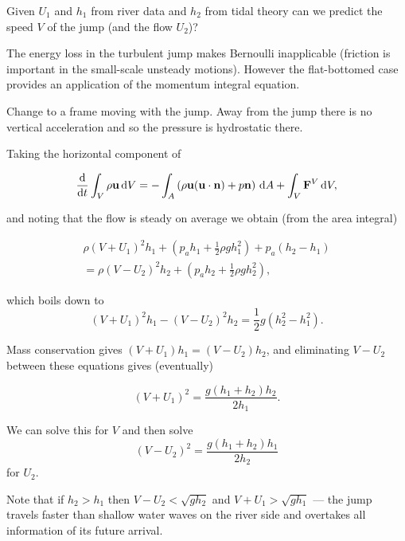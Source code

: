 \documentclass{notes}
\begin{document}
\vspace{2in}

Given $U_1$ and $h_1$ from river data and $h_2$ from tidal theory can
we predict the speed $V$ of the jump (and the flow $U_2$)?

The energy loss in the turbulent jump makes Bernoulli inapplicable
(friction is important in the small-scale unsteady motions).  However
the flat-bottomed case provides an application of the momentum
integral equation.

Change to a frame moving with the jump.  Away from the jump there is
no vertical acceleration and so the pressure is hydrostatic there.

\vspace*{2in}

Taking the horizontal component of

\[
\frac{\mathrm{d}}{\mathrm{d} t} \int_V \rho \mathbf{u} \,\mathrm{d} V = -\int_A \left(\rho \mathbf{u} (\mathbf{u}\cdot\mathbf{n})
+p \mathbf{n}\right) \,\mathrm{d} A + \int_V \mathbf{F}^V \,\mathrm{d} V,
\]

and noting that the flow is steady on average we obtain (from the area
integral)

\begin{multline*}
\rho (V + U_1)^2 h_1 + (p_a h_1 + \frac{1}{2} \rho g h_1^2) +
  p_a(h_2 - h_1)\\
 = \rho (V - U_2)^2 h_2 + (p_a h_2 + \frac{1}{2} \rho
  g h_2^2),
\end{multline*}

which boils down to
\[
(V+U_1)^2 h_1 - (V - U_2)^2 h_2 = \frac{1}{2} g (h_2^2 - h_1^2).
\]

Mass conservation gives $(V + U_1) h_1 = (V - U_2) h_2$, and
eliminating $V - U_2$ between these equations gives (eventually)

\[
(V+U_1)^2 = \frac{g (h_1+h_2)h_2}{2 h_1}.
\]

We can solve this for $V$ and then solve
\[
(V-U_2)^2 = \frac{g (h_1+h_2)h_1}{2 h_2}
\]
for $U_2$.

Note that if $h_2 > h_1$ then $V - U_2 < \sqrt{g h_2}$ and $V+U_1 >
\sqrt{g h_1}$ --- the jump travels faster than shallow water waves on
the river side and overtakes all information of its future arrival.

\backmatter
\end{document}
